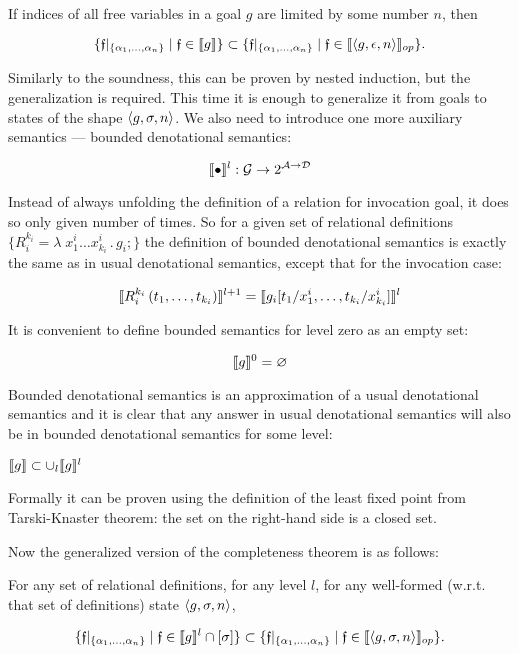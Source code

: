 \begin{theorem}
If indices of all free variables in a goal $g$ are limited by some number $n$, then

\[
\{\mathfrak{f}|_{\{\alpha_1,\dots,\alpha_n\}} \mid \mathfrak{f} \in \llbracket{g}\rrbracket\} \subset \{\mathfrak{f}|_{\{\alpha_1,\dots,\alpha_n\}} \mid \mathfrak{f} \in \llbracket{\left<{g, \epsilon, n}\right>}\rrbracket_{op}\}.
\]
\end{theorem}


Similarly to the soundness, this can be proven by nested induction, but the generalization is required. This time it is enough to generalize it from goals
to states of the shape $\left<{g, \sigma, n}\right>$. We also need to introduce one more auxiliary semantics --- bounded denotational semantics:

\[
\llbracket{\bullet}\rrbracket^l : \mathcal{G} \to 2^{\mathcal{A}\to\mathcal{D}}
\]

Instead of always unfolding the definition of a relation for invocation goal, it does so only given number of times. So for a given set of relational
definitions $\{R_i^{k_i} = \lambda\;x_1^i\dots x_{k_i}^i\,.\, g_i;\}$ the definition of bounded denotational semantics is exactly the same as in usual denotational semantics,
except that for the invocation case:

\[
\llbracket{R_i^{k_i}\,(t_1,\dots,t_{k_i})}\rrbracket^{l+1} = \llbracket{g_i[t_1/x_1^i, \dots, t_{k_i}/x_{k_i}^i]}\rrbracket^{l}
\]

It is convenient to define bounded semantics for level zero as an empty set:

\[
\llbracket{g}\rrbracket^{0} = \varnothing
\]

Bounded denotational semantics is an approximation of a usual denotational semantics and it is clear that any answer in usual denotational semantics will also be in
bounded denotational semantics for some level:

\begin{lemma}
$\llbracket{g}\rrbracket \subset \cup_l \llbracket{g}\rrbracket^l$
\end{lemma}

Formally it can be proven using the definition of the least fixed point from Tarski-Knaster theorem: the set on the right-hand side is a closed set.

Now the generalized version of the completeness theorem is as follows:

\begin{lemma}
For any set of relational definitions, for any level $l$, for any well-formed (w.r.t. that set of definitions) state $\left<{g, \sigma, n}\right>$,

\[
\{\mathfrak{f}|_{\{\alpha_1,\dots,\alpha_n\}} \mid \mathfrak{f} \in \llbracket{g}\rrbracket^l \cap [\sigma]\} \subset \{\mathfrak{f}|_{\{\alpha_1,\dots,\alpha_n\}} \mid \mathfrak{f} \in \llbracket{\left<{g, \sigma, n}\right>}\rrbracket_{op}\}.
\]
\end{lemma}

